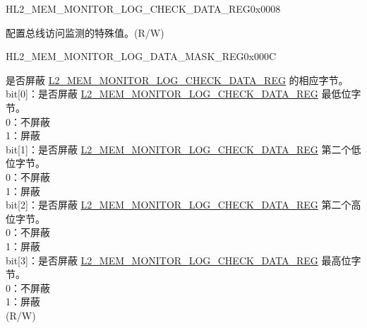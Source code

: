 \begin{register}{H}{L2\_MEM\_MONITOR\_LOG\_CHECK\_DATA\_REG}{0x0008}\label{regdesc:L2MEMMONITORLOGCHECKDATAREG}
%
\regnewline%
\begin{regdesc}\begin{reglist}
\label{fielddesc:L2MEMMONITORLOGCHECKDATA}\item [L2\_MEM\_MONITOR\_LOG\_CHECK\_DATA] 配置总线访问监测的特殊值。(R/W)
\end{reglist}\end{regdesc}
\end{register}


\begin{register}{H}{L2\_MEM\_MONITOR\_LOG\_DATA\_MASK\_REG}{0x000C}\label{regdesc:L2MEMMONITORLOGDATAMASKREG}
%
%
\regnewline%
\begin{regdesc}\begin{reglist}
\label{fielddesc:L2MEMMONITORLOGDATAMASK}\item[L2\_MEM\_MONITOR\_LOG\_DATA\_MASK] 是否屏蔽 \hyperref[regdesc:L2MEMMONITORLOGCHECKDATAREG]{L2\_MEM\_MONITOR\_LOG\_CHECK\_DATA\_REG} 的相应字节。\\
bit[0]：是否屏蔽 \hyperref[regdesc:L2MEMMONITORLOGCHECKDATAREG]{L2\_MEM\_MONITOR\_LOG\_CHECK\_DATA\_REG} 最低位字节。\\
0：不屏蔽\\
1：屏蔽\\
bit[1]：是否屏蔽 \hyperref[regdesc:L2MEMMONITORLOGCHECKDATAREG]{L2\_MEM\_MONITOR\_LOG\_CHECK\_DATA\_REG} 第二个低位字节。\\
0：不屏蔽\\
1：屏蔽\\
bit[2]：是否屏蔽 \hyperref[regdesc:L2MEMMONITORLOGCHECKDATAREG]{L2\_MEM\_MONITOR\_LOG\_CHECK\_DATA\_REG} 第二个高位字节。\\
0：不屏蔽\\
1：屏蔽\\
bit[3]：是否屏蔽 \hyperref[regdesc:L2MEMMONITORLOGCHECKDATAREG]{L2\_MEM\_MONITOR\_LOG\_CHECK\_DATA\_REG} 最高位字节。\\
0：不屏蔽\\
1：屏蔽\\
(R/W)
\end{reglist}\end{regdesc}
\end{register}


